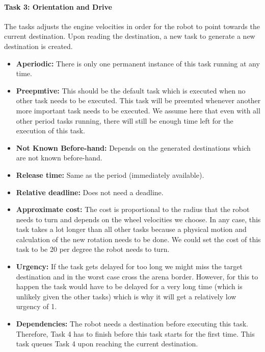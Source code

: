 \documentclass[12pt]{article}
\begin{document}
\paragraph{Task 3: Orientation and Drive} 
The tasks adjusts the engine velocities in order for the robot to point towards the current destination. Upon reading the destination, a new task to generate a new destination is created.
  \begin{itemize}
  	\item \textbf{Aperiodic:} There is only one permanent instance of this task running at any time.
	\item \textbf{Preepmtive:} This should be the default task which is executed when no other task needs to be executed. This task will be preemted whenever another more important task needs to be executed. We assume here that even with all other period tasks running, there will still be enough time left for the execution of this task.
  	\item \textbf{Not Known Before-hand:} Depends on the generated destinations which are not known before-hand.
  	\item \textbf{Release time:} Same as the period (immediately available).
  	\item \textbf{Relative deadline:} Does not need a deadline.
  	\item \textbf{Approximate cost:} The cost is proportional to the radius that the robot needs to turn and depends on the wheel velocities we choose. In any case, this task takes a lot longer than all other tasks because a physical motion and calculation of the new rotation needs to be done. We could set the cost of this task to be 20 per degree the robot needs to turn.
  	\item \textbf{Urgency:} If the task gets delayed for too long we might miss the target destination and in the worst case cross the arena border. However, for this to happen the task would have to be delayed for a very long time (which is unlikely given the other tasks) which is why it will get a relatively low urgency of 1.
  	\item \textbf{Dependencies:} The robot needs a destination before executing this task. Therefore, Task 4 has to finish before this task starts for the first time. This task queues Task 4 upon reaching the current destination.
   	\end{itemize} 
   	
\end{document}
